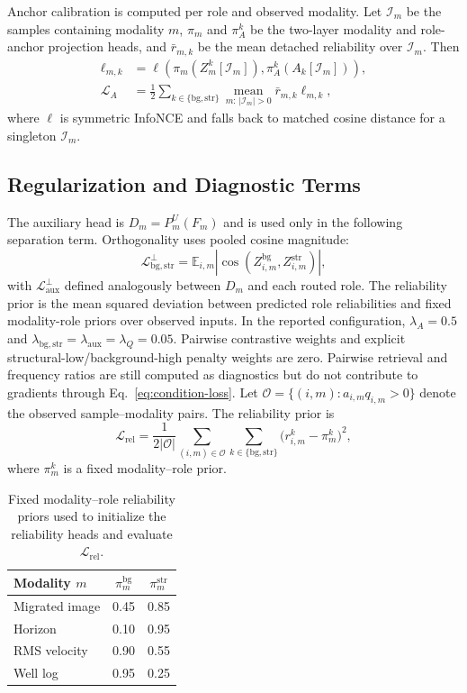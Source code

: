 Anchor calibration is computed per role and observed modality. Let $\mathcal I_m$ be the samples containing modality $m$, $\pi_m$ and $\pi_A^k$ be the two-layer modality and role-anchor projection heads, and $\bar r_{m,k}$ be the mean detached reliability over $\mathcal I_m$. Then
\begin{align}
\ell_{m,k}
&=\ell\!\left(\pi_m(Z_m^k[\mathcal I_m]),
\pi_A^k(A_k[\mathcal I_m])\right),\\
\mathcal L_A
&=\frac{1}{2}\sum_{k\in\{\mathrm{bg},\mathrm{str}\}}
\operatorname*{mean}_{m:\,|\mathcal I_m|>0}
\bar r_{m,k}\ell_{m,k},
\end{align}
where $\ell$ is symmetric InfoNCE and falls back to matched cosine distance for a singleton $\mathcal I_m$.

\subsection{Regularization and Diagnostic Terms}
The auxiliary head is $D_m=P_m^U(F_m)$ and is used only in the following separation term. Orthogonality uses pooled cosine magnitude:
\begin{equation}
\mathcal L_{\mathrm{bg,str}}^{\perp}
=\mathbb E_{i,m}|\cos(Z_{i,m}^{\mathrm{bg}},Z_{i,m}^{\mathrm{str}})|,
\end{equation}
with $\mathcal L_{\mathrm{aux}}^{\perp}$ defined analogously between $D_m$ and each routed role. The reliability prior is the mean squared deviation between predicted role reliabilities and fixed modality-role priors over observed inputs. In the reported configuration, $\lambda_A=0.5$ and $\lambda_{\mathrm{bg,str}}=\lambda_{\mathrm{aux}}=\lambda_Q=0.05$. Pairwise contrastive weights and explicit structural-low/background-high penalty weights are zero. Pairwise retrieval and frequency ratios are still computed as diagnostics but do not contribute to gradients through Eq.~\ref{eq:condition-loss}. Let $\mathcal O=\{(i,m):a_{i,m}q_{i,m}>0\}$ denote the observed sample--modality pairs. The reliability prior is
\begin{equation}
\mathcal L_{\mathrm{rel}}
 =\frac{1}{2|\mathcal O|}
 \sum_{(i,m)\in\mathcal O}
 \sum_{k\in\{\mathrm{bg},\mathrm{str}\}}
 \bigl(r_{i,m}^k-\pi_m^k\bigr)^2,
\end{equation}
where $\pi_m^k$ is a fixed modality--role prior.

\begin{table}[t]
\centering
\small
\begin{tabular}{@{}lcc@{}}
\toprule
Modality $m$ & $\pi_m^{\mathrm{bg}}$ & $\pi_m^{\mathrm{str}}$ \\
\midrule
Migrated image & 0.45 & 0.85 \\
Horizon & 0.10 & 0.95 \\
RMS velocity & 0.90 & 0.55 \\
Well log & 0.95 & 0.25 \\
\bottomrule
\end{tabular}
\caption{Fixed modality--role reliability priors used to initialize the reliability heads and evaluate $\mathcal L_{\mathrm{rel}}$.}
\label{tab:reliability-priors}
\end{table}

